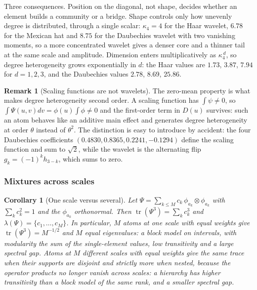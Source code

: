 \documentclass[11pt]{article}
\newtheorem{corollary}[theorem]{Corollary}
\theoremstyle{definition}
\newtheorem{remark}[definition]{Remark}
\newcommand{\1}{\mathbf 1}\newcommand{\op}{\operatorname}
\begin{document}
Three consequences.  Position on the diagonal, not shape, decides whether an
element builds a community or a bridge.  Shape controls only how unevenly
degree is distributed, through a single scalar: $\kappa_4=4$ for the Haar
wavelet, $6.78$ for the Mexican hat and $8.75$ for the Daubechies wavelet with
two vanishing moments, so a more concentrated wavelet gives a denser core and a
thinner tail at the same scale and amplitude.  Dimension enters
multiplicatively as $\kappa_4^{\,d}$, so degree heterogeneity grows
exponentially in $d$: the Haar values are $1.73$, $3.87$, $7.94$ for
$d=1,2,3$, and the Daubechies values $2.78$, $8.69$, $25.86$.

\begin{remark}[Scaling functions are not wavelets]
The zero-mean property is what makes degree heterogeneity second order.  A
scaling function has $\int\psi\ne0$, so $\int\Psi(u,v)dv=\phi(u)\int\phi\ne0$
and the first-order term in $D(u)$ survives: such an atom behaves like an
additive main effect and generates degree heterogeneity at order $\theta$
instead of $\theta^{2}$.  The distinction is easy to introduce by accident:
the four Daubechies coefficients $(0.4830,0.8365,0.2241,-0.1294)$ define the
scaling function and sum to $\sqrt2$, while the wavelet is the alternating flip
$g_k=(-1)^{k}h_{3-k}$, which sums to zero.
\end{remark}

\subsubsection{Mixtures across scales}

\begin{corollary}[One scale versus several]                   \label{cor:mix}
Let $\Psi=\sum_{k\le M}c_k\,\phi_{a_k}\otimes\phi_{a_k}$ with
$\sum_kc_k^{2}=1$ and the $\phi_{a_k}$ orthonormal.  Then
$\operatorname{tr}(\Psi^{3})=\sum_kc_k^{3}$ and
$\lambda(\Psi)=\{c_1,\dots,c_M\}$.  In particular, $M$ atoms at one scale
with equal weights give $\operatorname{tr}(\Psi^{3})=M^{-1/2}$ and $M$ equal
eigenvalues: a block model on intervals, with modularity the sum of the
single-element values, low transitivity and a large spectral gap.  Atoms at
$M$ different scales with equal weights give the same trace when their supports
are disjoint and strictly more when nested, because the operator products no
longer vanish across scales: a hierarchy has higher transitivity than a block
model of the same rank, and a smaller spectral gap.
\end{corollary}
\end{document}
